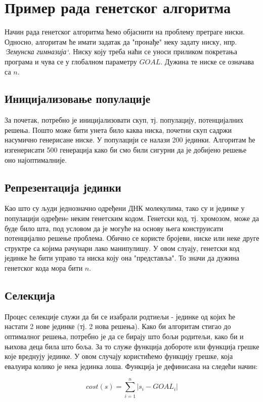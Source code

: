 \documentclass{article}
\begin{document}
\section{Пример рада генетског алгоритма}

Начин рада генетског алгоритма ћемо објаснити на проблему претраге ниски. Односно,
алгоритам ће имати задатак да "пронађе" неку задату ниску, нпр. \textit{`Земунска гимназија`}.
Ниску коју треба наћи се уноси приликом покретања програма и чува се у глобалном
параметру $GOAL$. Дужина те ниске се означава са $n$.

\subsection{Иницијализовање популације}
За почетак, потребно је иницијализовати скуп, тј. популацију, потенцијалних решења.
Пошто може бити унета било каква ниска, почетни скуп садржи насумично генерисане ниске.
У популацији се налази 200 јединки. Алгоритам ће изгенерисати 500 генерација како би смо били сигурни
да је добијено решење оно најоптималније.   

\subsection{Репрезентација јединки}
Као што су људи једнозначно одређени ДНК молекулима, тако су и јединке у популацији
одређенe неким генетским кодом. Генетски код, тј. хромозом, може да буде било шта, под условом да
је могуће на основу њега конструисати потенцијално решење проблема. Обично се користе бројеви, ниске или неке друге 
структре са којима рачунари лако манипулишу. У овом слуају, генетски код јединке
ће бити управо та ниска коју она "представља". То значи да дужина генетског кода мора бити $n$.

\subsection{Селекција}
Процес селекције служи да би се изабрали родтиељи - јединке од којих ће настати 2 нове 
јединке (тј. 2 нова решења). Како би алгоритам стигао до оптималног решења, потребно 
је да се бирају што бољи родитељи, како би и њихова деца била што боља. За то служе функција добороте или функција грешке које вреднују јединке.
У овом случају користићемо функцију грешке, која евалуира колико је нека јединка лоша. 
Функција је дефинисана на следећи начин: 

\begin{equation*}
    cost(s)=\sum_{i=1}^{n} |s_i - GOAL_i| 
\end{equation*}
\end{document}
